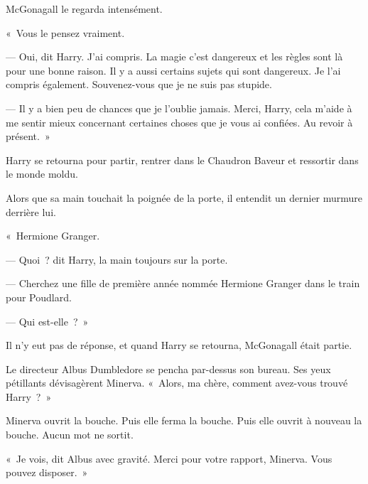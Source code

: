 McGonagall le regarda intensément.

«~Vous le pensez vraiment.

--- Oui, dit Harry. J'ai compris. La magie c'est dangereux et les règles sont là pour une bonne raison. Il y a aussi certains sujets qui sont dangereux.
Je l'ai compris également. Souvenez-vous que je ne suis pas stupide.

--- Il y a bien peu de chances que je l'oublie jamais. Merci, Harry, cela m'aide à me sentir mieux concernant certaines choses que je vous ai confiées. Au revoir à présent.~»

Harry se retourna pour partir, rentrer dans le Chaudron Baveur et ressortir dans le monde moldu.

Alors que sa main touchait la poignée de la porte, il entendit un dernier murmure derrière lui.

«~Hermione Granger.

--- Quoi~? dit Harry, la main toujours sur la porte.

--- Cherchez une fille de première année nommée Hermione Granger dans le train pour Poudlard.

--- Qui est-elle~?~»

Il n'y eut pas de réponse, et quand Harry se retourna, McGonagall était partie.

\aftermaths

Le directeur Albus Dumbledore se pencha par-dessus son bureau. Ses yeux pétillants dévisagèrent Minerva. «~Alors, ma chère, comment avez-vous trouvé Harry~?~»

Minerva ouvrit la bouche. Puis elle ferma la bouche. Puis elle ouvrit à nouveau la bouche. Aucun mot ne sortit.

«~Je vois, dit Albus avec gravité. Merci pour votre rapport, Minerva. Vous pouvez disposer.~»

